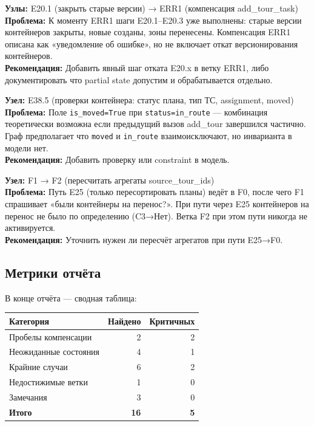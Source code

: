 \documentclass[11pt, a4paper, oneside]{article}
\begin{document}
\begin{warnbox}[title={🔴 Пробел компенсации — E20.1–E20.5}]
  \textbf{Узлы:} E20.1 (закрыть старые версии) → ERR1 (компенсация add\_tour\_task)\\
  \textbf{Проблема:} К моменту ERR1 шаги E20.1–E20.3 уже выполнены:
  старые версии контейнеров закрыты, новые созданы, зоны перенесены.
  Компенсация ERR1 описана как «уведомление об ошибке», но не включает
  откат версионирования контейнеров.\\
  \textbf{Рекомендация:} Добавить явный шаг отката E20.x в ветку ERR1,
  либо документировать что partial state допустим и обрабатывается отдельно.
\end{warnbox}

\begin{warnbox}[title={❗ Неожиданное состояние — E38.5}]
  \textbf{Узел:} E38.5 (проверки контейнера: статус плана, тип ТС, assignment, moved)\\
  \textbf{Проблема:} Поле \texttt{is\_moved=True} при \texttt{status=in\_route}
  — комбинация теоретически возможна если предыдущий вызов add\_tour завершился
  частично. Граф предполагает что \texttt{moved} и \texttt{in\_route} взаимоисключают,
  но инварианта в модели нет.\\
  \textbf{Рекомендация:} Добавить проверку или constraint в модель.
\end{warnbox}

\begin{infobox}[title={🟡 Недостижимая ветка — F2}]
  \textbf{Узел:} F1 → F2 (пересчитать агрегаты source\_tour\_ids)\\
  \textbf{Проблема:} Путь E25 (только пересортировать планы) ведёт в F0,
  после чего F1 спрашивает «были контейнеры на перенос?». При пути через E25
  контейнеров на перенос не было по определению (C3→Нет). Ветка F2 при этом
  пути никогда не активируется.\\
  \textbf{Рекомендация:} Уточнить нужен ли пересчёт агрегатов при пути E25→F0.
\end{infobox}

\subsection{Метрики отчёта}

В конце отчёта — сводная таблица:

\begin{center}
\begin{tabular}{lrr}
  \toprule
  \textbf{Категория} & \textbf{Найдено} & \textbf{Критичных} \\
  \midrule
  Пробелы компенсации & 2 & 2 \\
  Неожиданные состояния & 4 & 1 \\
  Крайние случаи & 6 & 2 \\
  Недостижимые ветки & 1 & 0 \\
  Замечания & 3 & 0 \\
  \midrule
  \textbf{Итого} & \textbf{16} & \textbf{5} \\
  \bottomrule
\end{tabular}
\end{center}
\end{document}
